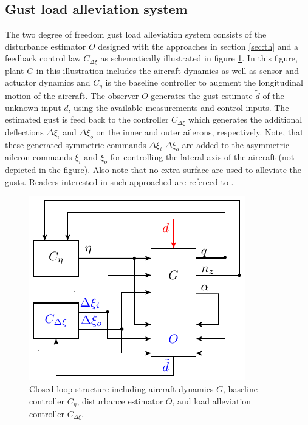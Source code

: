\documentclass[graybox]{svmult}
\begin{document}
\subsection{Gust load alleviation system}\label{APPsubsec:sys}
The two degree of freedom gust load alleviation system consists of the disturbance estimator $O$ designed with the approaches in section \ref{sec:th} and a feedback control law $C_{\Delta\xi}$ as schematically illustrated in figure \ref{fig:cl}. In this figure, plant $G$ in this illustration  includes the aircraft dynamics as well as sensor and actuator dynamics and $C_\eta$ is the baseline controller to augment the longitudinal motion of the aircraft.
The observer $O$ generates the gust estimate $\tilde d$ of the unknown input $d$, using the available measurements and control inputs. The estimated gust is feed back to the controller $C_{\Delta\xi}$ which generates the additional  deflections  $\Delta \xi_i$  and $\Delta \xi_o$ on the inner and outer ailerons, respectively. Note, that these generated symmetric commands $\Delta \xi_i$ $\Delta \xi_o$ are added to the asymmetric aileron commands  $\xi_i$  and $ \xi_o$ for controlling the lateral axis of the aircraft (not depicted in the figure). Also note that no extra surface are used to alleviate the gusts. Readers interested in such approached are refereed to  \cite{Pusch2015, Pusch2017}. 
 

\begin{figure}[h]
	\sidecaption[]
	\includegraphics{closedloop.pdf}
	\caption{Closed loop structure including aircraft dynamics $G$, baseline controller $C_\eta$, disturbance estimator $O$, and  load alleviation controller $C_{\Delta \xi}$. }
	\label{fig:cl}	
\end{figure}
\end{document}
